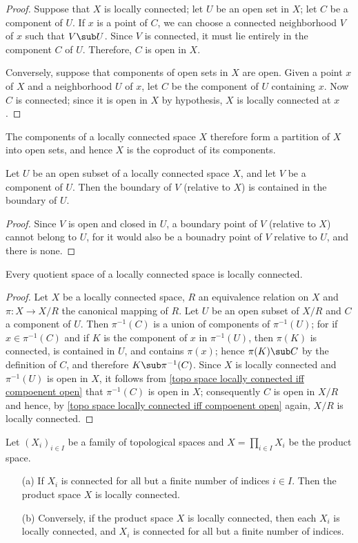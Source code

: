 \begin{proof}
Suppose that $X$ is locally connected; let $U$ be an open set in $X$; let $C$ be a component of $U$. If $x$ is a point of $C$, we can choose a connected neighborhood $V$ of $x$ such that $V\sub U$. Since $V$ is connected, it must lie entirely in the component $C$ of $U$. Therefore, $C$ is open in $X$.\par
Conversely, suppose that components of open sets in $X$ are open. Given a point $x$ of $X$ and a neighborhood $U$ of $x$, let $C$ be the component of $U$ containing $x$. Now $C$ is connected; since it is open in $X$ by hypothesis, $X$ is locally connected at $x$.
\end{proof}
The components of a locally connected space $X$ therefore form a partition of $X$ into open sets, and hence $X$ is the coproduct of its components.
\begin{corollary}
Let $U$ be an open subset of a locally connected space $X$, and let $V$ be a component of $U$. Then the boundary of $V$ (relative to $X$) is contained in the boundary of $U$.
\end{corollary}
\begin{proof}
Since $V$ is open and closed in $U$, a boundary point of $V$ (relative to $X$) cannot belong to $U$, for it would also be a bounadry point of $V$ relative to $U$, and there is none.
\end{proof}
\begin{proposition}\label{topo space quotient space locally connected}
Every quotient space of a locally connected space is locally connected.
\end{proposition}
\begin{proof}
Let $X$ be a locally connected space, $R$ an equivalence relation on $X$ and $\pi:X\to X/R$ the canonical mapping of $R$. Let $U$ be an open subset of $X/R$ and $C$ a component of $U$. Then $\pi^{-1}(C)$ is a union of components of $\pi^{-1}(U)$; for if $x\in\pi^{-1}(C)$ and if $K$ is the component of $x$ in $\pi^{-1}(U)$, then $\pi(K)$ is connected, is contained in $U$, and contains $\pi(x)$; hence $\pi(K)\sub C$ by the definition of $C$, and therefore $K\sub\pi^{-1}(C)$. Since $X$ is locally connected and $\pi^{-1}(U)$ is open in $X$, it follows from \cref{topo space locally connected iff compoenent open} that $\pi^{-1}(C)$ is open in $X$; consequently $C$ is open in $X/R$ and hence, by \cref{topo space locally connected iff compoenent open} again, $X/R$ is locally connected.
\end{proof}
\begin{proposition}
Let $(X_i)_{i\in I}$ be a family of topological spaces and $X=\prod_{i\in I}X_i$ be the product space.
\begin{itemize}
\item[(a)] If $X_i$ is connected for all but a finite number of indices $i\in I$. Then the product space $X$ is locally connected.
\item[(b)] Conversely, if the product space $X$ is locally connected, then each $X_i$ is locally connected, and $X_i$ is connected for all but a finite number of indices.
\end{itemize}
\end{proposition}
